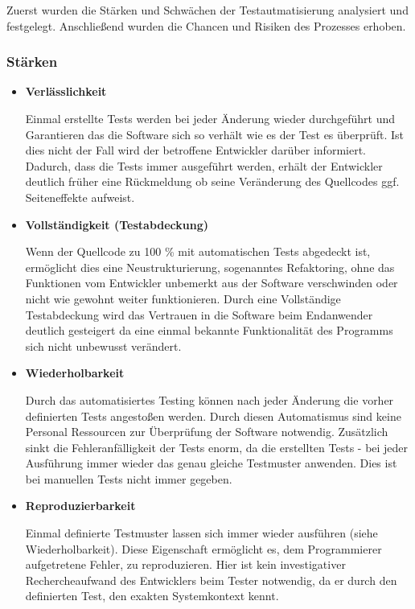 Zuerst wurden die Stärken und Schwächen der Testautmatisierung analysiert und festgelegt. Anschließend wurden die Chancen und Risiken des Prozesses erhoben. 
\subsubsection{Stärken}
\begin{itemize}	
	\item \textbf{Verlässlichkeit}
	
	Einmal erstellte Tests werden bei jeder Änderung wieder durchgeführt und Garantieren das die Software sich so verhält wie es der Test es überprüft. Ist dies nicht der Fall wird der betroffene Entwickler darüber informiert. Dadurch, dass die Tests immer ausgeführt werden, erhält der Entwickler deutlich früher eine Rückmeldung ob seine Veränderung des Quellcodes ggf. Seiteneffekte aufweist.
	
	\item \textbf{Vollständigkeit (Testabdeckung)}
	
	Wenn der Quellcode zu 100 \% mit automatischen Tests abgedeckt ist, ermöglicht dies eine Neustrukturierung, sogenanntes Refaktoring, ohne das Funktionen vom Entwickler unbemerkt aus der Software verschwinden oder nicht wie gewohnt weiter funktionieren. Durch eine Vollständige Testabdeckung wird das Vertrauen in die Software beim Endanwender deutlich gesteigert da eine einmal bekannte Funktionalität des Programms sich nicht unbewusst verändert.
	
	\item \textbf{Wiederholbarkeit}
	
	Durch das automatisiertes Testing können nach jeder Änderung die vorher definierten Tests angestoßen werden. Durch diesen Automatismus sind keine Personal Ressourcen zur Überprüfung der Software notwendig. Zusätzlich sinkt die Fehleranfälligkeit der Tests enorm, da die erstellten Tests - bei jeder Ausführung immer wieder das genau gleiche Testmuster anwenden. Dies ist bei manuellen Tests nicht immer gegeben.
	
	\item \textbf{Reproduzierbarkeit}
	
	Einmal definierte Testmuster lassen sich immer wieder ausführen (siehe Wiederholbarkeit). Diese Eigenschaft ermöglicht es, dem Programmierer aufgetretene Fehler, zu reproduzieren. Hier ist kein investigativer Rechercheaufwand des Entwicklers beim Tester notwendig, da er durch den definierten Test, den exakten Systemkontext kennt.
	

\end{itemize}
